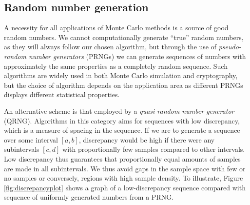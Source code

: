 \subsection{Random number generation}
A necessity for all applications of Monte Carlo methods is a source of
good random numbers. We cannot computationally generate ``true'' random
numbers, as they will always follow our chosen algorithm, but through
the use of \emph{pseudo-random number generators} (PRNGs) we can
generate sequences of numbers with approximately the same properties
as a completely random sequence. Such algorithms are widely used in both
Monte Carlo simulation and cryptography, but the choice of algorithm
depends on the application area as different PRNGs displays different
statistical properties.

An alternative scheme is that employed by a \emph{quasi-random number
  generator} (QRNG). Algorithms in this category aims for sequences
with low discrepancy, which is a measure of spacing in the
sequence. If we are to generate a sequence over some interval $[a,b]$,
discrepancy would be high if there were any subintervals $[c,d]$ with
proportionally few samples compared to other
intervals. Low discrepancy thus guarantees that proportionally equal
amounts of samples are made in all subintervals. We thus avoid gaps in
the sample space with few or no samples or conversely, regions with
high sample density. To illustrate, Figure \ref{fig:discrepancyplot}
shows a graph of a low-discrepancy sequence compared with sequence of
uniformly generated numbers from a PRNG.

